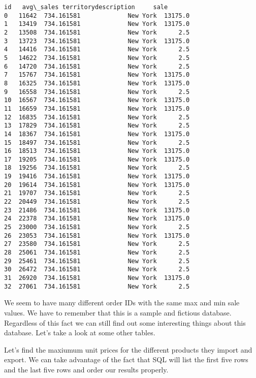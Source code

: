 \documentclass[11pt]{article}
\makeatletter
\newcommand{\boxspacing}{\kern\kvtcb@left@rule\kern\kvtcb@boxsep}
\newcommand{\prompt}[4]{
        {\ttfamily\llap{{\color{#2}[#3]:\hspace{3pt}#4}}\vspace{-\baselineskip}}
    }
\makeatother
\begin{document}
            \begin{tcolorbox}[breakable, size=fbox, boxrule=.5pt, pad at break*=1mm, opacityfill=0]
\prompt{Out}{outcolor}{30}{\boxspacing}
\begin{Verbatim}[commandchars=\\\{\}]
       id   avg\_sales territorydescription     sale
0   11642  734.161581             New York  13175.0
1   13419  734.161581             New York  13175.0
2   13508  734.161581             New York      2.5
3   13723  734.161581             New York  13175.0
4   14416  734.161581             New York      2.5
5   14622  734.161581             New York      2.5
6   14720  734.161581             New York      2.5
7   15767  734.161581             New York  13175.0
8   16325  734.161581             New York  13175.0
9   16558  734.161581             New York      2.5
10  16567  734.161581             New York  13175.0
11  16659  734.161581             New York  13175.0
12  16835  734.161581             New York      2.5
13  17829  734.161581             New York      2.5
14  18367  734.161581             New York  13175.0
15  18497  734.161581             New York      2.5
16  18513  734.161581             New York  13175.0
17  19205  734.161581             New York  13175.0
18  19256  734.161581             New York      2.5
19  19416  734.161581             New York  13175.0
20  19614  734.161581             New York  13175.0
21  19707  734.161581             New York      2.5
22  20449  734.161581             New York      2.5
23  21486  734.161581             New York  13175.0
24  22378  734.161581             New York  13175.0
25  23000  734.161581             New York      2.5
26  23053  734.161581             New York  13175.0
27  23580  734.161581             New York      2.5
28  25061  734.161581             New York      2.5
29  25461  734.161581             New York      2.5
30  26472  734.161581             New York      2.5
31  26920  734.161581             New York  13175.0
32  27061  734.161581             New York      2.5
\end{Verbatim}
\end{tcolorbox}
        
    We seem to have many different order IDs with the same max and min sale
values. We have to remember that this is a sample and fictious database.
Regardless of this fact we can still find out some interesting things
about this database. Let's take a look at some other tables.

Let's find the maxiumum unit prices for the different products they
import and export. We can take advantage of the fact that SQL will list
the first five rows and the last five rows and order our results
properly.
\end{document}
